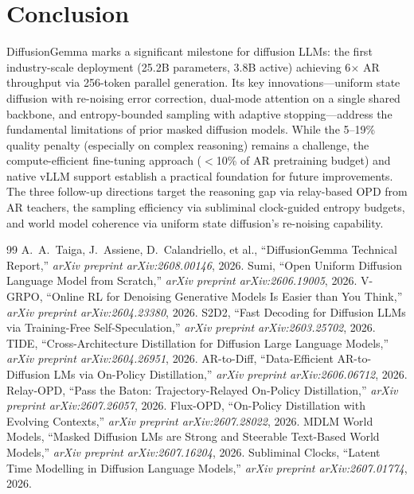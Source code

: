 \documentclass[11pt,a4paper]{article}
\begin{document}
\section{Conclusion}
DiffusionGemma marks a significant milestone for diffusion LLMs: the first industry-scale deployment (25.2B parameters, 3.8B active) achieving 6$\times$ AR throughput via 256-token parallel generation. Its key innovations---uniform state diffusion with re-noising error correction, dual-mode attention on a single shared backbone, and entropy-bounded sampling with adaptive stopping---address the fundamental limitations of prior masked diffusion models. While the 5--19\% quality penalty (especially on complex reasoning) remains a challenge, the compute-efficient fine-tuning approach ($<$10\% of AR pretraining budget) and native vLLM support establish a practical foundation for future improvements. The three follow-up directions target the reasoning gap via relay-based OPD from AR teachers, the sampling efficiency via subliminal clock-guided entropy budgets, and world model coherence via uniform state diffusion's re-noising capability.

\begin{thebibliography}{99}
 A.~A.~Taiga, J.~Assiene, D.~Calandriello, et al., ``DiffusionGemma Technical Report,'' \emph{arXiv preprint arXiv:2608.00146}, 2026.
 Sumi, ``Open Uniform Diffusion Language Model from Scratch,'' \emph{arXiv preprint arXiv:2606.19005}, 2026.
 V-GRPO, ``Online RL for Denoising Generative Models Is Easier than You Think,'' \emph{arXiv preprint arXiv:2604.23380}, 2026.
 S2D2, ``Fast Decoding for Diffusion LLMs via Training-Free Self-Speculation,'' \emph{arXiv preprint arXiv:2603.25702}, 2026.
 TIDE, ``Cross-Architecture Distillation for Diffusion Large Language Models,'' \emph{arXiv preprint arXiv:2604.26951}, 2026.
 AR-to-Diff, ``Data-Efficient AR-to-Diffusion LMs via On-Policy Distillation,'' \emph{arXiv preprint arXiv:2606.06712}, 2026.
 Relay-OPD, ``Pass the Baton: Trajectory-Relayed On-Policy Distillation,'' \emph{arXiv preprint arXiv:2607.26057}, 2026.
 Flux-OPD, ``On-Policy Distillation with Evolving Contexts,'' \emph{arXiv preprint arXiv:2607.28022}, 2026.
 MDLM World Models, ``Masked Diffusion LMs are Strong and Steerable Text-Based World Models,'' \emph{arXiv preprint arXiv:2607.16204}, 2026.
 Subliminal Clocks, ``Latent Time Modelling in Diffusion Language Models,'' \emph{arXiv preprint arXiv:2607.01774}, 2026.
\end{thebibliography}
\end{document}
